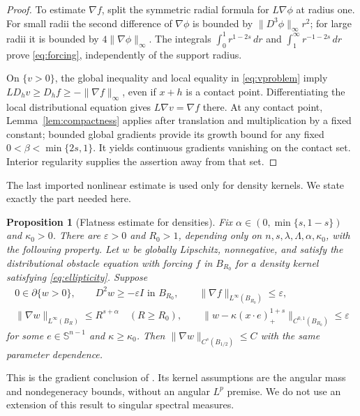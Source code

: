 \documentclass[11pt]{article}
\numberwithin{equation}{section}
\newtheorem{proposition}[theorem]{Proposition}
\theoremstyle{remark}
\newcommand{\Sph}{\mathbb S^{n-1}}
\newcommand{\norm}[1]{\lVert #1\rVert}
\newcommand{\dd}{\,d}
\begin{document}
\begin{proof}
To estimate $\nabla f$, split the symmetric radial formula for $L\nabla\phi$ at radius one. For small radii the second difference of $\nabla\phi$ is bounded by $\norm{D^3\phi}_\infty r^2$; for large radii it is bounded by $4\norm{\nabla\phi}_\infty$. The integrals $\int_0^1r^{1-2s}\dd r$ and $\int_1^\infty r^{-1-2s}\dd r$ prove \eqref{eq:forcing}, independently of the support radius.

On $\{v>0\}$, the global inequality and local equality in \eqref{eq:vproblem} imply $LD_hv\ge D_hf\ge-\norm{\nabla f}_\infty$, even if $x+h$ is a contact point. Differentiating the local distributional equation gives $L\nabla v=\nabla f$ there. At any contact point, Lemma~\ref{lem:compactness} applies after translation and multiplication by a fixed constant; bounded global gradients provide its growth bound for any fixed $0<\beta<\min\{2s,1\}$. It yields continuous gradients vanishing on the contact set. Interior regularity supplies the assertion away from that set.
\end{proof}

The last imported nonlinear estimate is used only for density kernels. We state exactly the part needed here.

\begin{proposition}[Flatness estimate for densities]\label{prop:flatness}
Fix $\alpha\in(0,\min\{s,1-s\})$ and $\kappa_0>0$. There are $\varepsilon>0$ and $R_0>1$, depending only on $n,s,\lambda,\Lambda,\alpha,\kappa_0$, with the following property. Let $w$ be globally Lipschitz, nonnegative, and satisfy the distributional obstacle equation with forcing $f$ in $B_{R_0}$ for a density kernel satisfying \eqref{eq:ellipticity}. Suppose
\begin{gather*}
 0\in\partial\{w>0\},\qquad D^2w\ge-\varepsilon I\text{ in }B_{R_0},
 \qquad\norm{\nabla f}_{L^\infty(B_{R_0})}\le\varepsilon,\\
 \norm{\nabla w}_{L^\infty(B_R)}\le R^{s+\alpha}\quad(R\ge R_0),\qquad
 \norm{w-\kappa(x\cdot e)_+^{1+s}}_{C^{0,1}(B_{R_0})}\le\varepsilon
\end{gather*}
for some $e\in\Sph$ and $\kappa\ge\kappa_0$. Then
$\norm{\nabla w}_{C^s(B_{1/2})}\le C$ with the same parameter dependence.
\end{proposition}
This is the gradient conclusion of \cite[Proposition 5.8]{ROW}. Its kernel assumptions are the angular mass and nondegeneracy bounds, without an angular $L^p$ premise. We do not use an extension of this result to singular spectral measures.
\end{document}
